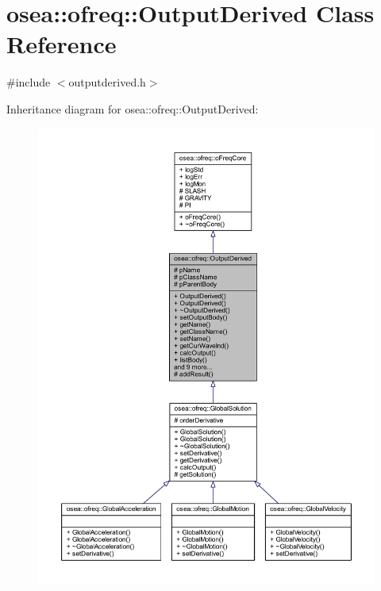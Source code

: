 \hypertarget{classosea_1_1ofreq_1_1_output_derived}{\section{osea\-:\-:ofreq\-:\-:Output\-Derived Class Reference}
\label{classosea_1_1ofreq_1_1_output_derived}
}


{\ttfamily \#include $<$outputderived.\-h$>$}



Inheritance diagram for osea\-:\-:ofreq\-:\-:Output\-Derived\-:
\nopagebreak
\begin{figure}[H]
\begin{center}
\leavevmode
\includegraphics[width=350pt]{classosea_1_1ofreq_1_1_output_derived__inherit__graph}
\end{center}
\end{figure}
